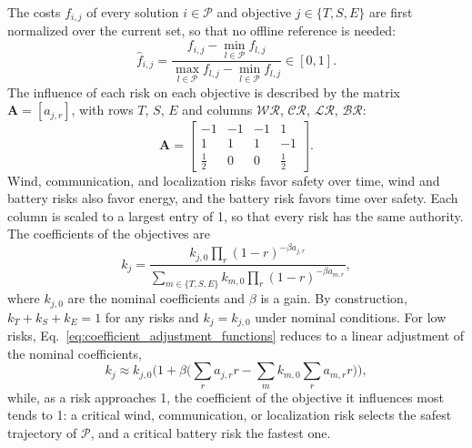 \documentclass[journal]{IEEEtran}
\begin{document}
The costs $f_{i,j}$ of every solution $i \in \mathcal{P}$ and objective $j \in \{T, S, E\}$ are first normalized over the current set, so that no offline reference is needed:
\begin{equation}
    \label{eq:cost_normalization}
    \hat{f}_{i,j} = \frac{f_{i,j} - \min_{l \in \mathcal{P}} f_{l,j}}{\max_{l \in \mathcal{P}} f_{l,j} - \min_{l \in \mathcal{P}} f_{l,j}} \in [0, 1].
\end{equation}
The influence of each risk on each objective is described by the matrix $\mathbf{A} = [a_{j,r}]$, with rows $T$, $S$, $E$ and columns $\mathcal{WR}$, $\mathcal{CR}$, $\mathcal{LR}$, $\mathcal{BR}$:
\begin{equation}
    \label{eq:influence_matrix}
    \mathbf{A} =
    \begin{bmatrix}
        -1 & -1 & -1 & 1 \\
        1 & 1 & 1 & -1 \\
        \tfrac{1}{2} & 0 & 0 & \tfrac{1}{2}
    \end{bmatrix}.
\end{equation}
Wind, communication, and localization risks favor safety over time, wind and battery risks also favor energy, and the battery risk favors time over safety. Each column is scaled to a largest entry of 1, so that every risk has the same authority. The coefficients of the objectives are
\begin{equation}
    \label{eq:coefficient_adjustment_functions}
    k_{j} = \frac{k_{j,0} \prod_{r} (1 - r)^{-\beta a_{j,r}}}{\sum_{m \in \{T, S, E\}} k_{m,0} \prod_{r} (1 - r)^{-\beta a_{m,r}}},
\end{equation}
where $k_{j,0}$ are the nominal coefficients and $\beta$ is a gain. By construction, $k_{T} + k_{S} + k_{E} = 1$ for any risks and $k_{j} = k_{j,0}$ under nominal conditions. For low risks, Eq.~\ref{eq:coefficient_adjustment_functions} reduces to a linear adjustment of the nominal coefficients,
\begin{equation}
    \label{eq:coefficient_first_order}
    k_{j} \approx k_{j,0} \Big(1 + \beta \big(\textstyle\sum_{r} a_{j,r} r - \sum_{m} k_{m,0} \sum_{r} a_{m,r} r\big)\Big),
\end{equation}
while, as a risk approaches 1, the coefficient of the objective it influences most tends to 1: a critical wind, communication, or localization risk selects the safest trajectory of $\mathcal{P}$, and a critical battery risk the fastest one.
\end{document}
